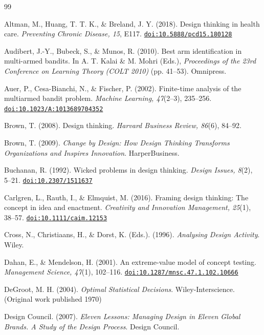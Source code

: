 \documentclass[10pt,twocolumn]{article}
\providecommand{\doi}[1]{\href{https://doi.org/#1}{\nolinkurl{doi:#1}}}
\theoremstyle{definition}
\begin{document}
\begin{thebibliography}{99}
\setlength{\itemsep}{0pt}\setlength{\parsep}{0pt}\small

 Altman, M., Huang, T. T. K., \& Breland, J. Y. (2018). Design thinking in health care. \textit{Preventing Chronic Disease, 15}, E117. \doi{10.5888/pcd15.180128}

 Audibert, J.-Y., Bubeck, S., \& Munos, R. (2010). Best arm identification in multi-armed bandits. In A. T. Kalai \& M. Mohri (Eds.), \textit{Proceedings of the 23rd Conference on Learning Theory (COLT 2010)} (pp. 41--53). Omnipress.

 Auer, P., Cesa-Bianchi, N., \& Fischer, P. (2002). Finite-time analysis of the multiarmed bandit problem. \textit{Machine Learning, 47}(2--3), 235--256. \doi{10.1023/A:1013689704352}

 Brown, T. (2008). Design thinking. \textit{Harvard Business Review, 86}(6), 84--92.

 Brown, T. (2009). \textit{Change by Design: How Design Thinking Transforms Organizations and Inspires Innovation}. HarperBusiness.

 Buchanan, R. (1992). Wicked problems in design thinking. \textit{Design Issues, 8}(2), 5--21. \doi{10.2307/1511637}

 Carlgren, L., Rauth, I., \& Elmquist, M. (2016). Framing design thinking: The concept in idea and enactment. \textit{Creativity and Innovation Management, 25}(1), 38--57. \doi{10.1111/caim.12153}

 Cross, N., Christiaans, H., \& Dorst, K. (Eds.). (1996). \textit{Analysing Design Activity}. Wiley.

 Dahan, E., \& Mendelson, H. (2001). An extreme-value model of concept testing. \textit{Management Science, 47}(1), 102--116. \doi{10.1287/mnsc.47.1.102.10666}

 DeGroot, M. H. (2004). \textit{Optimal Statistical Decisions}. Wiley-Interscience. (Original work published 1970)

 Design Council. (2007). \textit{Eleven Lessons: Managing Design in Eleven Global Brands. A Study of the Design Process}. Design Council.


\end{thebibliography}
\end{document}
